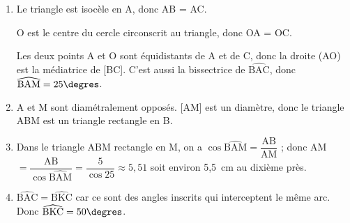 \documentclass[10pt]{article}
\begin{document}
\begin{enumerate}
\item %
Le triangle est isocèle en A, donc AB = AC.

O est le centre du cercle circonscrit au triangle, donc OA = OC.

Les deux points A et O sont équidistants de A et de C, donc la droite (AO) est la médiatrice de [BC]. C’est aussi la bissectrice de $\widehat{\text{BAC}}$, donc $\widehat{\text{BAM}} = 25\degres$.
\item %
A et M sont diamétralement opposés. [AM] est un diamètre, donc le triangle ABM est un triangle rectangle en B.
\item %
Dans le triangle ABM rectangle en M, on a $\cos   \widehat{\text{BAM}} = \dfrac{\text{AB}}{\text{AM}}$ ; donc AM $ = \dfrac{\text{AB}}{ \cos  \widehat{\text{BAM}}} = \dfrac{5}{ \cos 25} \approx 5,51$ soit environ 5,5~cm au dixième près.
\item %
$\widehat{\text{BAC}} = \widehat{\text{BKC}}$ car ce sont des angles inscrits qui interceptent le même arc. Donc $\widehat{\text{BKC}} = 50\degres$.

\end{enumerate}

\bigskip
\end{document}
